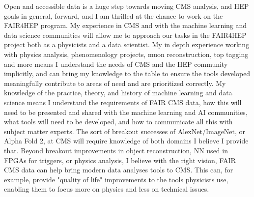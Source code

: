 \documentclass[11pt]{article}
\begin{document}

Open and accessible data is a huge step towards moving CMS analysis, and HEP goals in general, forward, and I am thrilled at the chance to work on the FAIR4HEP program. My experience in CMS and with the machine learning and data science communities will allow me to approach our tasks in the FAIR4HEP project both as a physicists and a data scientist. My in depth experience working with physics analysis, phenomenology projects, muon reconstruction, top tagging and more means I understand the needs of CMS and the HEP community implicitly, and can bring my knowledge to the table to ensure the tools developed meaningfully contribute to areas of need and are prioritized correctly. My knowledge of the practice, theory, and history of machine learning and data science means I understand the requirements of FAIR CMS data, how this will need to be presented and shared with the machine learning and AI communities, what tools will need to be developed, and how to communicate all this with subject matter experts. The sort of breakout successes of AlexNet/ImageNet, or Alpha Fold 2, at CMS will require knowledge of both domains I believe I provide that. Beyond breakout improvements in object reconstruction, NN used in FPGAs for triggers, or physics analysis, I believe with the right vision, FAIR CMS data can help bring modern data analyses tools to CMS. This can, for example, provide "quality of life" improvements to the tools physicists use, enabling them to focus more on physics and less on technical issues. 


\end{document}
